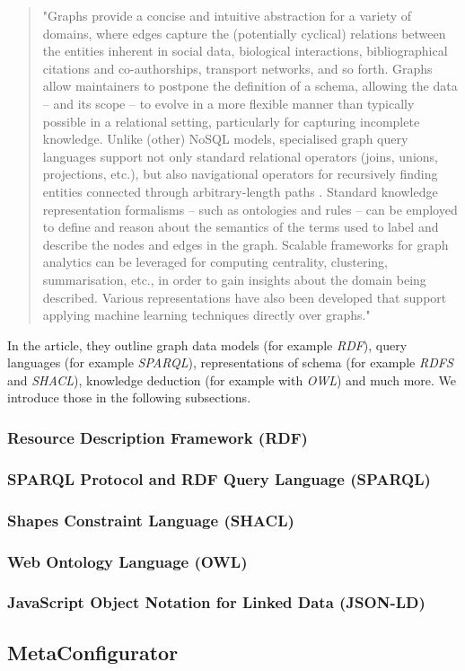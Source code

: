 \begin{quote}
	"Graphs provide a concise and intuitive abstraction for a variety of domains, where edges capture the (potentially cyclical) relations between the entities inherent in social data, biological interactions, bibliographical citations and co-authorships, transport networks, and so forth. Graphs allow maintainers to postpone the definition of a schema, allowing the data – and its scope – to evolve in a more flexible manner than typically possible in a relational setting, particularly for capturing incomplete knowledge. Unlike (other) NoSQL models, specialised graph query languages support not only standard relational operators (joins, unions, projections, etc.), but also navigational operators for recursively finding entities connected through arbitrary-length paths . Standard knowledge representation formalisms – such as ontologies and rules – can be employed to define and reason about the semantics of the terms used to label and describe the nodes and edges in the graph. Scalable frameworks for graph analytics can be leveraged for computing centrality, clustering, summarisation, etc., in order to gain insights about the domain being described. Various representations have also been developed that support applying machine learning techniques directly over graphs."\cite{hogan2021knowledge}
\end{quote}
In the article\cite{hogan2021knowledge}, they outline graph data models (for example \textit{RDF}), query languages (for example \textit{SPARQL}), representations of schema (for example \textit{RDFS} and \textit{SHACL}), knowledge deduction (for example with \textit{OWL}) and much more.
We introduce those in the following subsections.



\subsubsection{Resource Description Framework (RDF)}




\subsubsection{SPARQL Protocol and RDF Query Language (SPARQL)}


\subsubsection{Shapes Constraint Language (SHACL)}


\subsubsection{Web Ontology Language (OWL)}



\subsubsection{JavaScript Object Notation for Linked Data (JSON-LD)}


\subsection{MetaConfigurator}